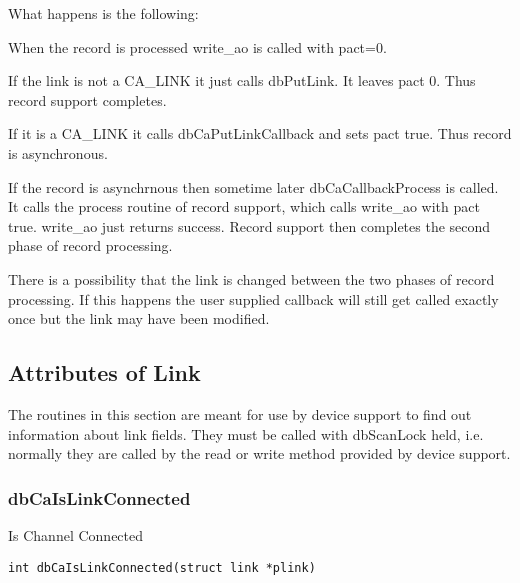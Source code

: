 What happens is the following:

\begin{description}

\item When the record is processed write\_ao is called with pact=0.

\begin{description}

\item If the link is not a CA\_LINK it just calls dbPutLink.
It leaves pact 0.
Thus record support completes.

\item If it is a CA\_LINK it calls dbCaPutLinkCallback and sets pact true.
Thus record is asynchronous.

\end{description}

\item If the record is asynchrnous then sometime later dbCaCallbackProcess is called.
It calls the process routine of record support, which calls write\_ao with pact true.
write\_ao just returns success.
Record support then completes the second phase of record processing.

\end{description}

There is a possibility that the link is changed between the two phases of record processing.
If this happens the user supplied callback will still get called exactly once but the link may have been modified.

\subsection{Attributes of Link}

The routines in this section are meant for use by device support to find out information about link fields.
They must be called with dbScanLock held, i.e. normally they are called by the read or write method provided by device support.

\subsubsection{dbCaIsLinkConnected}

Is Channel Connected

\begin{verbatim}
int dbCaIsLinkConnected(struct link *plink)
\end{verbatim}

